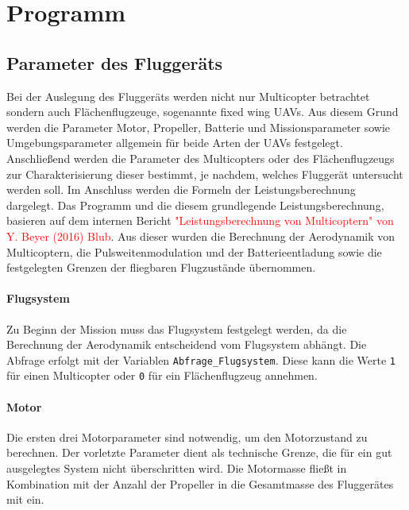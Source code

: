 \chapter{Programm}
\label{chap:Programm}

\section{Parameter des Fluggeräts}
\label{sec:parameter_fluggeraet}
Bei der Auslegung des Fluggeräts werden nicht nur Multicopter betrachtet sondern auch Flächenflugzeuge, sogenannte fixed wing UAVs. Aus diesem Grund werden die Parameter Motor, Propeller, Batterie und Missionsparameter sowie Umgebungsparameter allgemein für beide Arten der UAVs festgelegt. Anschließend werden die Parameter des Multicopters oder des Flächenflugzeugs zur Charakterisierung dieser bestimmt, je nachdem, welches Fluggerät untersucht werden soll. Im Anschluss werden die Formeln der Leistungsberechnung dargelegt. 
Das Programm und die diesem grundlegende Leistungsberechnung, basieren auf dem internen Bericht \textcolor{red}{"Leistungsberechnung von Multicoptern" von Y. Beyer (2016) Blub}. Aus dieser wurden die Berechnung der Aerodynamik von Multicoptern, die Pulsweitenmodulation und der Batterieentladung sowie die festgelegten Grenzen der fliegbaren Flugzustände übernommen. 
 
\subsubsection{Flugsystem}
Zu Beginn der Mission muss das Flugsystem festgelegt werden, da die Berechnung der Aerodynamik entscheidend vom Flugsystem abhängt. Die Abfrage erfolgt mit der Variablen \texttt{Abfrage\_Flugsystem}. Diese kann die Werte \texttt{1} für einen Multicopter oder \texttt{0} für ein Flächenflugzeug annehmen.

\subsubsection{Motor}
Die ersten drei Motorparameter sind notwendig, um den Motorzustand zu berechnen. Der vorletzte Parameter dient als technische Grenze, die für ein gut ausgelegtes System nicht überschritten wird. Die Motormasse fließt in Kombination mit der Anzahl der Propeller in die Gesamtmasse des Fluggerätes mit ein.

